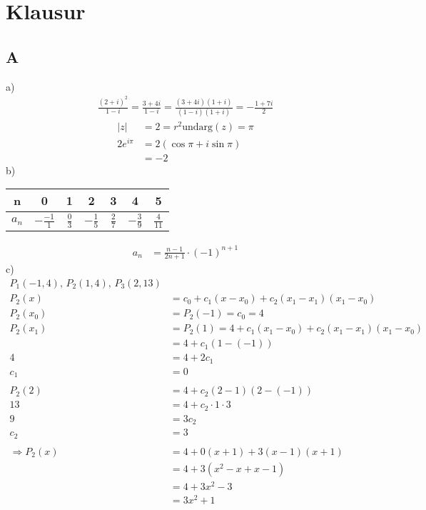 \documentclass{article}
\begin{document}
\section*{Klausur}
\subsection*{A}
a)\\
\begin{align*}
    \frac{(2+i)^2}{1-i} = \frac{3+4i}{1-i} = \frac{(3+4i)(1+i)}{(1-i)(1+i)} = -\frac{1+7i}{2}
\end{align*}
\begin{align*}
    \lvert z \rvert &= 2 = r^2 \text{und} \mathrm{arg} (z) = \pi\\
    2e^{i\pi} &= 2 \left(\cos \pi + i \sin \pi\right)\\
    &= -2
\end{align*}
b)
\begin{center}
    \begin{tabular}{c c c c c c c}
        \hline
        n & 0 & 1 & 2 & 3 & 4 & 5\\
        \hline
        $a_n$ & $-\frac{-1}{1}$ & $\frac{0}{3}$ & $-\frac{1}{5}$ & $\frac{2}{7}$ & $-\frac{3}{9}$ & $\frac{4}{11}$\\
    \end{tabular}
\end{center}
\begin{align*}
    a_n &= \frac{n-1}{2n+1}\cdot (-1)^{n+1}
\end{align*}
c)
\begin{align*}
    P_1(-1,4),\,P_2(1,4),\,P_3(2,13)\\
    P_2(x) &= c_0 + c_1 (x-x_0) + c_2 (x_1-x_1)(x_1 - x_0)\\
    P_2(x_0) &= P_2(-1) = c_0 = 4\\
    P_2(x_1) &= P_2(1) = 4+c_1(x_1-x_0)+c_2(x_1-x_1)(x_1-x_0)\\
    &= 4+c_1(1-(-1))\\
    4 &= 4+2c_1\\
    c_1 &= 0\\\\
    P_2(2) &= 4 + c_2(2-1)(2-(-1))\\
    13 &= 4+ c_2 \cdot 1 \cdot 3\\
    9 &= 3c_2\\
    c_2 &= 3\\\\
    \Rightarrow P_2(x) &= 4+0(x+1)+3(x-1)(x+1)\\
    &= 4+3(x^2-x+x-1)\\
    &= 4+3x^2-3\\
    &= 3x^2+1
\end{align*}
\end{document}
